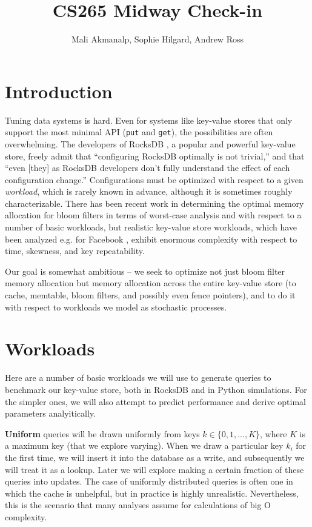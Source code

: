 \documentclass[11pt]{article}
\begin{document}
\title{CS265 Midway Check-in}
\author{Mali Akmanalp, Sophie Hilgard, Andrew Ross}
\maketitle

\section{Introduction}

Tuning data systems is hard. Even for systems like key-value stores that only
support the most minimal API (\texttt{put} and \texttt{get}), the possibilities
are often overwhelming. The developers of RocksDB \citep{rocksdb}, a popular
and powerful key-value store, freely admit \citep{rocksdb-tuning-guide} that
``configuring RocksDB optimally is not trivial,'' and that ``even [they] as
RocksDB developers don't fully understand the effect of each configuration
change.'' Configurations must be optimized with respect to a given
\textit{workload}, which is rarely known in advance, although it is sometimes
roughly characterizable. There has been recent work \citep{monkey} in
determining the optimal memory allocation for bloom filters in terms of
worst-case analysis and with respect to a number of basic workloads, but
realistic key-value store workloads, which have been analyzed e.g. for Facebook
\citep{characterizing-memcached}, exhibit enormous complexity with respect to
time, skewness, and key repeatability.

Our goal is somewhat ambitious -- we seek to optimize not just bloom filter
memory allocation but memory allocation across the entire key-value store (to
cache, memtable, bloom filters, and possibly even fence pointers), and to do it
with respect to workloads we model as stochastic processes.

\section{Workloads}

Here are a number of basic workloads we will use to generate queries to
benchmark our key-value store, both in RocksDB and in Python simulations. For
the simpler ones, we will also attempt to predict performance and derive
optimal parameters analyitically.

\textbf{Uniform} queries will be drawn uniformly from keys $k \in
\{0,1,...,K\}$, where $K$ is a maximum key (that we explore varying). When we
draw a particular key $k_i$ for the first time, we will insert it into the
database as a write, and subsequently we will treat it as a lookup. Later we
will explore making a certain fraction of these queries into updates. The case
of uniformly distributed queries is often one in which the cache is unhelpful,
but in practice is highly unrealistic. Nevertheless, this is the scenario that
many analyses assume for calculations of big O complexity.
\end{document}
